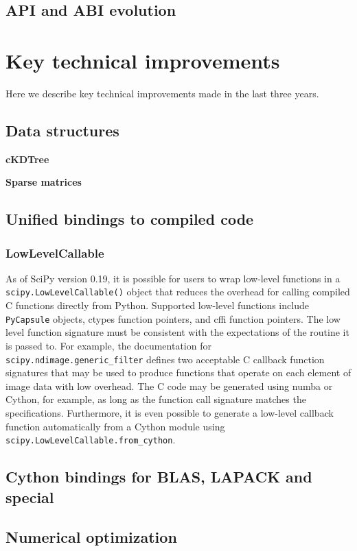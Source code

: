 \documentclass[fleqn,10pt]{wlscirep}
\begin{document}
\subsection*{API and ABI evolution}


\section*{Key technical improvements}

Here we describe key technical improvements made in the last three years.

\subsection*{Data structures}
\textbf{cKDTree}

\textbf{Sparse matrices}

\subsection*{Unified bindings to compiled code}
\subsubsection*{LowLevelCallable}
As of SciPy version 0.19, it is possible for users to wrap low-level
functions in a \texttt{scipy.LowLevelCallable()} object that reduces
the overhead for calling compiled C functions directly from Python.
Supported low-level functions include \texttt{PyCapsule} objects,
ctypes function pointers, and cffi function pointers. The low level
function signature must be consistent with the expectations of the
routine it is passed to. For example, the documentation for
\texttt{scipy.ndimage.generic\_filter} defines two acceptable C callback
function signatures that may be used to produce functions that operate
on each element of image data with low overhead. The C code may be
generated using numba or Cython, for example, as long as the function
call signature matches the specifications. Furthermore, it is even
possible to generate a low-level callback function automatically
from a Cython module using \texttt{scipy.LowLevelCallable.from\_cython}.

\subsection*{Cython bindings for BLAS, LAPACK and special}

\subsection*{Numerical optimization}

\end{document}
